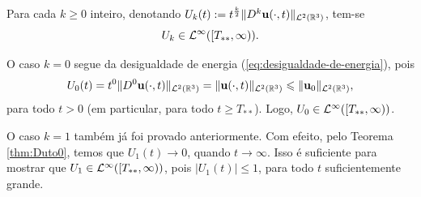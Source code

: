 \begin{lbox} \label{lm:uk}
    Para cada $k \geqslant 0$ inteiro, denotando $U_k(t) := t^{\frac{k}{2}} \Vert D^k \mathbf{u}(\cdot,t) \Vert_{\mathcal{L}^2(\mathbb{R}^3)}$, tem-se
    \[
        U_k \in \mathcal{L}^\infty([T_{**}, \infty)).
    \]
\end{lbox}
\begin{prf}
    O caso $k = 0$ segue da desigualdade de energia (\ref{eq:desigualdade-de-energia}), pois
    \[
        U_0(t) =t^0 \Vert D^0\mathbf{u}(\cdot,t) \Vert_{\mathcal{L}^2(\mathbb{R}^3)} = \Vert \mathbf{u}(\cdot,t) \Vert_{\mathcal{L}^2(\mathbb{R}^3)} \leqslant \Vert \mathbf{u}_0 \Vert_{\mathcal{L}^2(\mathbb{R}^3)},
    \]
    para todo $t > 0$ (em particular, para todo $t \geqslant T_{**}$). Logo, $U_0 \in \mathcal{L}^{\infty}([T_{**}, \infty))$.

    O caso $k = 1$ também já foi provado anteriormente. Com efeito,
    pelo Teorema \ref{thm:Duto0}, temos que $U_1(t) \to 0$, quando $t \to \infty$. Isso é suficiente para mostrar que $U_1 \in \mathcal{L}^\infty([T_{**}, \infty))$, pois $|U_1(t)| \leqslant 1$, para todo $t$ suficientemente grande.


\end{prf}
